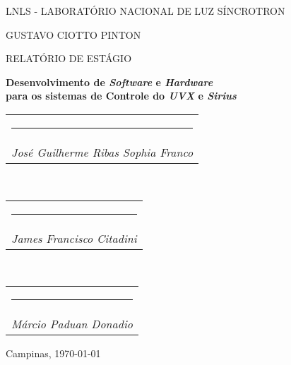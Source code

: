 \newcommand{\namesigdate}[2][8cm]{%
  \begin{tabular}{@{}p{#1}}
    \\[1\normalbaselineskip] \hrule \\[0pt]
    {\small \textit{#2}} \\[1\normalbaselineskip]
  \end{tabular}
}

\begin{center}


\vspace*{12pt}

LNLS - LABORATÓRIO NACIONAL DE LUZ SÍNCROTRON

\vspace*{.25\textheight}

{\Large GUSTAVO CIOTTO PINTON}

\vspace*{60pt}

RELATÓRIO DE ESTÁGIO

\vspace{12pt}

\textbf{\Large Desenvolvimento de \textit{Software} e \textit{Hardware} \\ para
os sistemas de Controle do \textit{UVX} e \textit{Sirius}} \\ \vspace{12pt}

\begin{flushright}


\vspace{12pt}

\namesigdate{José Guilherme Ribas Sophia Franco} \\
\namesigdate{James Francisco Citadini} \\
\namesigdate{Márcio Paduan Donadio}
\end{flushright}

 
Campinas, \today

\end{center}

\newpage 
